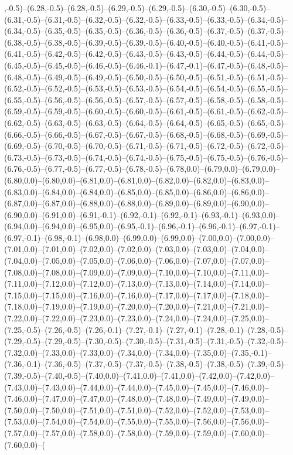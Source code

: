 ,-0.5)--(6.28,-0.5)--(6.28,-0.5)--(6.29,-0.5)--(6.29,-0.5)--(6.30,-0.5)--(6.30,-0.5)--(6.31,-0.5)--(6.31,-0.5)--(6.32,-0.5)--(6.32,-0.5)--(6.33,-0.5)--(6.33,-0.5)--(6.34,-0.5)--(6.34,-0.5)--(6.35,-0.5)--(6.35,-0.5)--(6.36,-0.5)--(6.36,-0.5)--(6.37,-0.5)--(6.37,-0.5)--(6.38,-0.5)--(6.38,-0.5)--(6.39,-0.5)--(6.39,-0.5)--(6.40,-0.5)--(6.40,-0.5)--(6.41,-0.5)--(6.41,-0.5)--(6.42,-0.5)--(6.42,-0.5)--(6.43,-0.5)--(6.43,-0.5)--(6.44,-0.5)--(6.44,-0.5)--(6.45,-0.5)--(6.45,-0.5)--(6.46,-0.5)--(6.46,-0.1)--(6.47,-0.1)--(6.47,-0.5)--(6.48,-0.5)--(6.48,-0.5)--(6.49,-0.5)--(6.49,-0.5)--(6.50,-0.5)--(6.50,-0.5)--(6.51,-0.5)--(6.51,-0.5)--(6.52,-0.5)--(6.52,-0.5)--(6.53,-0.5)--(6.53,-0.5)--(6.54,-0.5)--(6.54,-0.5)--(6.55,-0.5)--(6.55,-0.5)--(6.56,-0.5)--(6.56,-0.5)--(6.57,-0.5)--(6.57,-0.5)--(6.58,-0.5)--(6.58,-0.5)--(6.59,-0.5)--(6.59,-0.5)--(6.60,-0.5)--(6.60,-0.5)--(6.61,-0.5)--(6.61,-0.5)--(6.62,-0.5)--(6.62,-0.5)--(6.63,-0.5)--(6.63,-0.5)--(6.64,-0.5)--(6.64,-0.5)--(6.65,-0.5)--(6.65,-0.5)--(6.66,-0.5)--(6.66,-0.5)--(6.67,-0.5)--(6.67,-0.5)--(6.68,-0.5)--(6.68,-0.5)--(6.69,-0.5)--(6.69,-0.5)--(6.70,-0.5)--(6.70,-0.5)--(6.71,-0.5)--(6.71,-0.5)--(6.72,-0.5)--(6.72,-0.5)--(6.73,-0.5)--(6.73,-0.5)--(6.74,-0.5)--(6.74,-0.5)--(6.75,-0.5)--(6.75,-0.5)--(6.76,-0.5)--(6.76,-0.5)--(6.77,-0.5)--(6.77,-0.5)--(6.78,-0.5)--(6.78,0.0)--(6.79,0.0)--(6.79,0.0)--(6.80,0.0)--(6.80,0.0)--(6.81,0.0)--(6.81,0.0)--(6.82,0.0)--(6.82,0.0)--(6.83,0.0)--(6.83,0.0)--(6.84,0.0)--(6.84,0.0)--(6.85,0.0)--(6.85,0.0)--(6.86,0.0)--(6.86,0.0)--(6.87,0.0)--(6.87,0.0)--(6.88,0.0)--(6.88,0.0)--(6.89,0.0)--(6.89,0.0)--(6.90,0.0)--(6.90,0.0)--(6.91,0.0)--(6.91,-0.1)--(6.92,-0.1)--(6.92,-0.1)--(6.93,-0.1)--(6.93,0.0)--(6.94,0.0)--(6.94,0.0)--(6.95,0.0)--(6.95,-0.1)--(6.96,-0.1)--(6.96,-0.1)--(6.97,-0.1)--(6.97,-0.1)--(6.98,-0.1)--(6.98,0.0)--(6.99,0.0)--(6.99,0.0)--(7.00,0.0)--(7.00,0.0)--(7.01,0.0)--(7.01,0.0)--(7.02,0.0)--(7.02,0.0)--(7.03,0.0)--(7.03,0.0)--(7.04,0.0)--(7.04,0.0)--(7.05,0.0)--(7.05,0.0)--(7.06,0.0)--(7.06,0.0)--(7.07,0.0)--(7.07,0.0)--(7.08,0.0)--(7.08,0.0)--(7.09,0.0)--(7.09,0.0)--(7.10,0.0)--(7.10,0.0)--(7.11,0.0)--(7.11,0.0)--(7.12,0.0)--(7.12,0.0)--(7.13,0.0)--(7.13,0.0)--(7.14,0.0)--(7.14,0.0)--(7.15,0.0)--(7.15,0.0)--(7.16,0.0)--(7.16,0.0)--(7.17,0.0)--(7.17,0.0)--(7.18,0.0)--(7.18,0.0)--(7.19,0.0)--(7.19,0.0)--(7.20,0.0)--(7.20,0.0)--(7.21,0.0)--(7.21,0.0)--(7.22,0.0)--(7.22,0.0)--(7.23,0.0)--(7.23,0.0)--(7.24,0.0)--(7.24,0.0)--(7.25,0.0)--(7.25,-0.5)--(7.26,-0.5)--(7.26,-0.1)--(7.27,-0.1)--(7.27,-0.1)--(7.28,-0.1)--(7.28,-0.5)--(7.29,-0.5)--(7.29,-0.5)--(7.30,-0.5)--(7.30,-0.5)--(7.31,-0.5)--(7.31,-0.5)--(7.32,-0.5)--(7.32,0.0)--(7.33,0.0)--(7.33,0.0)--(7.34,0.0)--(7.34,0.0)--(7.35,0.0)--(7.35,-0.1)--(7.36,-0.1)--(7.36,-0.5)--(7.37,-0.5)--(7.37,-0.5)--(7.38,-0.5)--(7.38,-0.5)--(7.39,-0.5)--(7.39,-0.5)--(7.40,-0.5)--(7.40,0.0)--(7.41,0.0)--(7.41,0.0)--(7.42,0.0)--(7.42,0.0)--(7.43,0.0)--(7.43,0.0)--(7.44,0.0)--(7.44,0.0)--(7.45,0.0)--(7.45,0.0)--(7.46,0.0)--(7.46,0.0)--(7.47,0.0)--(7.47,0.0)--(7.48,0.0)--(7.48,0.0)--(7.49,0.0)--(7.49,0.0)--(7.50,0.0)--(7.50,0.0)--(7.51,0.0)--(7.51,0.0)--(7.52,0.0)--(7.52,0.0)--(7.53,0.0)--(7.53,0.0)--(7.54,0.0)--(7.54,0.0)--(7.55,0.0)--(7.55,0.0)--(7.56,0.0)--(7.56,0.0)--(7.57,0.0)--(7.57,0.0)--(7.58,0.0)--(7.58,0.0)--(7.59,0.0)--(7.59,0.0)--(7.60,0.0)--(7.60,0.0)--(